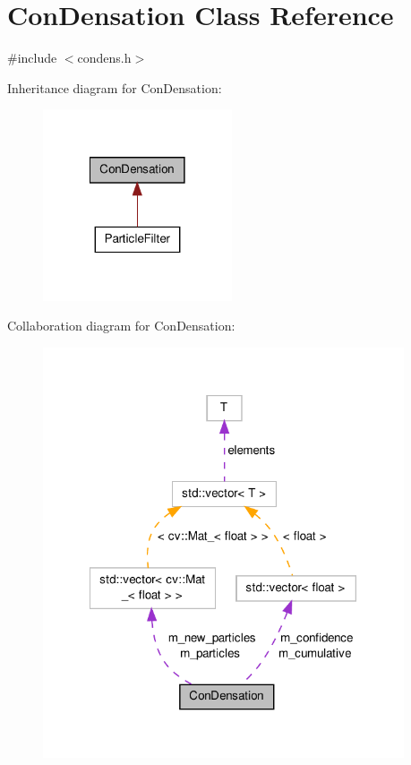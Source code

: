 \hypertarget{classConDensation}{\section{Con\-Densation Class Reference}
\label{classConDensation}
}


{\ttfamily \#include $<$condens.\-h$>$}



Inheritance diagram for Con\-Densation\-:
\nopagebreak
\begin{figure}[H]
\begin{center}
\leavevmode
\includegraphics[width=158pt]{classConDensation__inherit__graph}
\end{center}
\end{figure}


Collaboration diagram for Con\-Densation\-:
\nopagebreak
\begin{figure}[H]
\begin{center}
\leavevmode
\includegraphics[width=302pt]{classConDensation__coll__graph}
\end{center}
\end{figure}
